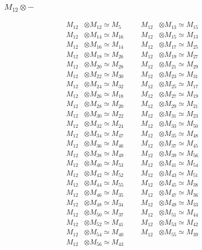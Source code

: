 \subsubsection{$ M_{12}\otimes -$}
\begin{align*}
M_{12} &\otimes M_{12} \simeq M_{5} &&& M_{12} &\otimes M_{13} \simeq M_{15}\\
M_{12} &\otimes M_{14} \simeq M_{16} &&& M_{12} &\otimes M_{15} \simeq M_{13}\\
M_{12} &\otimes M_{16} \simeq M_{14} &&& M_{12} &\otimes M_{17} \simeq M_{25}\\
M_{12} &\otimes M_{18} \simeq M_{26} &&& M_{12} &\otimes M_{19} \simeq M_{27}\\
M_{12} &\otimes M_{20} \simeq M_{28} &&& M_{12} &\otimes M_{21} \simeq M_{29}\\
M_{12} &\otimes M_{22} \simeq M_{30} &&& M_{12} &\otimes M_{23} \simeq M_{31}\\
M_{12} &\otimes M_{24} \simeq M_{32} &&& M_{12} &\otimes M_{25} \simeq M_{17}\\
M_{12} &\otimes M_{26} \simeq M_{18} &&& M_{12} &\otimes M_{27} \simeq M_{19}\\
M_{12} &\otimes M_{28} \simeq M_{20} &&& M_{12} &\otimes M_{29} \simeq M_{21}\\
M_{12} &\otimes M_{30} \simeq M_{22} &&& M_{12} &\otimes M_{31} \simeq M_{23}\\
M_{12} &\otimes M_{32} \simeq M_{24} &&& M_{12} &\otimes M_{33} \simeq M_{50}\\
M_{12} &\otimes M_{34} \simeq M_{47} &&& M_{12} &\otimes M_{35} \simeq M_{48}\\
M_{12} &\otimes M_{36} \simeq M_{46} &&& M_{12} &\otimes M_{37} \simeq M_{45}\\
M_{12} &\otimes M_{38} \simeq M_{49} &&& M_{12} &\otimes M_{39} \simeq M_{56}\\
M_{12} &\otimes M_{40} \simeq M_{53} &&& M_{12} &\otimes M_{41} \simeq M_{54}\\
M_{12} &\otimes M_{42} \simeq M_{52} &&& M_{12} &\otimes M_{43} \simeq M_{51}\\
M_{12} &\otimes M_{44} \simeq M_{55} &&& M_{12} &\otimes M_{45} \simeq M_{38}\\
M_{12} &\otimes M_{46} \simeq M_{35} &&& M_{12} &\otimes M_{47} \simeq M_{36}\\
M_{12} &\otimes M_{48} \simeq M_{34} &&& M_{12} &\otimes M_{49} \simeq M_{33}\\
M_{12} &\otimes M_{50} \simeq M_{37} &&& M_{12} &\otimes M_{51} \simeq M_{44}\\
M_{12} &\otimes M_{52} \simeq M_{41} &&& M_{12} &\otimes M_{53} \simeq M_{42}\\
M_{12} &\otimes M_{54} \simeq M_{40} &&& M_{12} &\otimes M_{55} \simeq M_{39}\\
M_{12} &\otimes M_{56} \simeq M_{43}
\end{align*}

